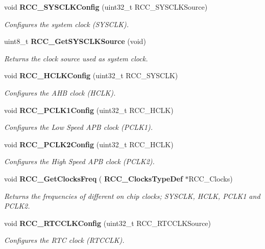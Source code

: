 \begin{DoxyCompactItemize}
void \textbf{ R\+C\+C\+\_\+\+S\+Y\+S\+C\+L\+K\+Config} (uint32\+\_\+t R\+C\+C\+\_\+\+S\+Y\+S\+C\+L\+K\+Source)
\begin{DoxyCompactList}\small\item\em Configures the system clock (S\+Y\+S\+C\+LK). \end{DoxyCompactList}\item 
uint8\+\_\+t \textbf{ R\+C\+C\+\_\+\+Get\+S\+Y\+S\+C\+L\+K\+Source} (void)
\begin{DoxyCompactList}\small\item\em Returns the clock source used as system clock. \end{DoxyCompactList}\item 
void \textbf{ R\+C\+C\+\_\+\+H\+C\+L\+K\+Config} (uint32\+\_\+t R\+C\+C\+\_\+\+S\+Y\+S\+C\+LK)
\begin{DoxyCompactList}\small\item\em Configures the A\+HB clock (H\+C\+LK). \end{DoxyCompactList}\item 
void \textbf{ R\+C\+C\+\_\+\+P\+C\+L\+K1\+Config} (uint32\+\_\+t R\+C\+C\+\_\+\+H\+C\+LK)
\begin{DoxyCompactList}\small\item\em Configures the Low Speed A\+PB clock (P\+C\+L\+K1). \end{DoxyCompactList}\item 
void \textbf{ R\+C\+C\+\_\+\+P\+C\+L\+K2\+Config} (uint32\+\_\+t R\+C\+C\+\_\+\+H\+C\+LK)
\begin{DoxyCompactList}\small\item\em Configures the High Speed A\+PB clock (P\+C\+L\+K2). \end{DoxyCompactList}\item 
void \textbf{ R\+C\+C\+\_\+\+Get\+Clocks\+Freq} (\textbf{ R\+C\+C\+\_\+\+Clocks\+Type\+Def} $\ast$R\+C\+C\+\_\+\+Clocks)
\begin{DoxyCompactList}\small\item\em Returns the frequencies of different on chip clocks; S\+Y\+S\+C\+LK, H\+C\+LK, P\+C\+L\+K1 and P\+C\+L\+K2. \end{DoxyCompactList}\item 
void \textbf{ R\+C\+C\+\_\+\+R\+T\+C\+C\+L\+K\+Config} (uint32\+\_\+t R\+C\+C\+\_\+\+R\+T\+C\+C\+L\+K\+Source)
\begin{DoxyCompactList}\small\item\em Configures the R\+TC clock (R\+T\+C\+C\+LK). \end{DoxyCompactList}\item 

\end{DoxyCompactItemize}
